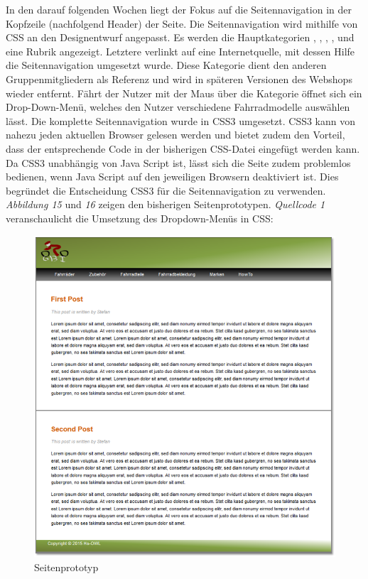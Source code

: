 In den darauf folgenden Wochen liegt der Fokus auf die Seitennavigation in der Kopfzeile (nachfolgend Header) der Seite. Die Seitennavigation wird mithilfe von CSS an den Designentwurf angepasst. Es werden die Hauptkategorien \grqq{}, \grqq{}, \grqq{}, \grqq{}, \grqq{} und eine Rubrik \grqq{} angezeigt. Letztere verlinkt auf eine Internetquelle, mit dessen Hilfe die Seitennavigation umgesetzt wurde. Diese Kategorie dient den anderen Gruppenmitgliedern als Referenz und wird in späteren Versionen des Webshops wieder entfernt. Fährt der Nutzer mit der Maus über die Kategorie \grqq{} öffnet sich ein Drop-Down-Menü, welches den Nutzer verschiedene Fahrradmodelle auswählen lässt. Die komplette Seitennavigation wurde in CSS3 umgesetzt. CSS3 kann von nahezu jeden aktuellen Browser gelesen werden und bietet zudem den Vorteil, dass der entsprechende Code in der bisherigen CSS-Datei eingefügt werden kann. Da CSS3 unabhängig von Java Script ist, lässt sich die Seite zudem problemlos bedienen, wenn Java Script auf den jeweiligen Browsern deaktiviert ist. Dies begründet die Entscheidung CSS3 für die Seitennavigation zu verwenden.
\\
\textit{Abbildung 15} und \textit{16} zeigen den bisherigen Seitenprototypen. \textit{Quellcode 1} veranschaulicht die Umsetzung des Dropdown-Menüs in CSS:

\begin{figure}[H]
\begin{center}
\includegraphics[width=150mm]{Bilder/Abbildung3-Seitenprototyp.png}
\end{center}
\caption{Seitenprototyp}
\end{figure}


